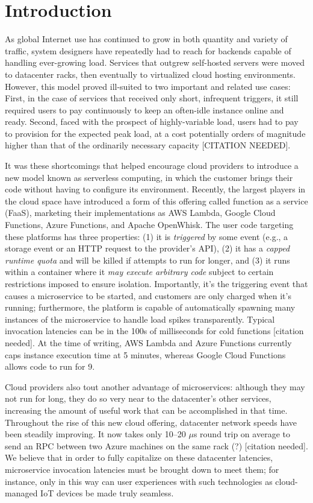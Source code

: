\section{Introduction}
\label{sec:intro}

As global Internet use has continued to grow in both quantity and variety of traffic, system designers have repeatedly had to reach for backends capable of handling ever-growing load.
Services that outgrew self-hosted servers were moved to datacenter racks, then eventually to virtualized cloud hosting environments.
However, this model proved ill-suited to two important and related use cases:
First, in the case of services that received only short, infrequent triggers, it still required users to pay continuously to keep an often-idle instance online and ready.
Second, faced with the prospect of highly-variable load, users had to pay to provision for the expected peak load, at a cost potentially orders of magnitude higher than that of the ordinarily necessary capacity [CITATION NEEDED].

It was these shortcomings that helped encourage cloud providers to introduce a new model known as serverless computing, in which the customer brings their code without having to configure its environment.
Recently, the largest players in the cloud space have introduced a form of this offering called function as a service (FaaS), marketing their implementations as AWS Lambda, Google Cloud Functions, Azure Functions, and Apache OpenWhisk.
The user code targeting these platforms has three properties: (1) it is \textit{triggered} by some event (e.g., a storage event or an HTTP request to the provider's API), (2) it has a \textit{capped runtime quota} and will be killed if attempts to run for longer, and (3) it runs within a container where it \textit{may execute arbitrary code} subject to certain restrictions imposed to ensure isolation.
Importantly, it's the triggering event that causes a microservice to be started, and customers are only charged when it's running; furthermore, the platform is capable of automatically spawning many instances of the microservice to handle load spikes transparently.
Typical invocation latencies can be in the 100s of milliseconds for cold functions [citation needed].
At the time of writing, AWS Lambda and Azure Functions currently caps instance execution time at 5 minutes, whereas Google Cloud Functions allows code to run for 9.

Cloud providers also tout another advantage of microservices: although they may not run for long, they do so very near to the datacenter's other services, increasing the amount of useful work that can be accomplished in that time.
Throughout the rise of this new cloud offering, datacenter network speeds have been steadily improving.
It now takes only 10--20 $\mu$s round trip on average to send an RPC between two Azure machines on the same rack (?) [citation needed].
We believe that in order to fully capitalize on these datacenter latencies, microservice invocation latencies must be brought down to meet them; for instance, only in this way can user experiences with such technologies as cloud-managed IoT devices be made truly seamless.

